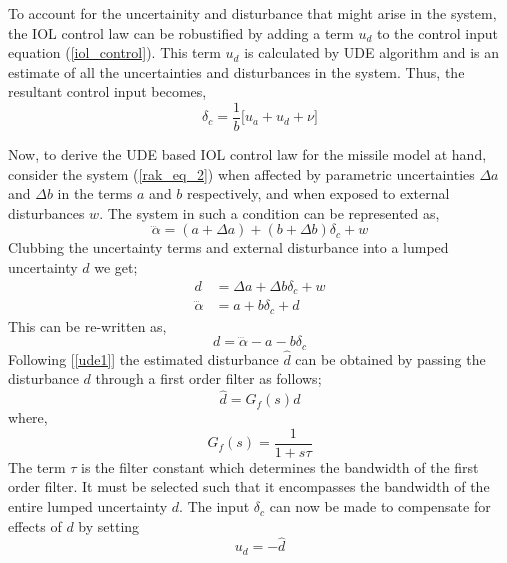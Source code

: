 \documentclass[conference]{IEEEtran}
\begin{document}
		To account for the uncertainity and disturbance that might arise in the system, the IOL control law can be robustified by adding a term $u_d$ to the control input equation (\ref{iol_control}). This term $u_d$ is calculated by UDE algorithm and is an estimate of all the uncertainties and disturbances in the system. Thus, the resultant control input becomes, 
		\begin{equation}
		\label{ude_control_law}
			\delta_c = \frac{1}{b}\Big[u_a+u_d+\nu\Big] 
		\end{equation}
		
		Now, to derive the UDE based IOL control law for the missile model at hand, consider the system (\ref{rak_eq_2}) when affected by parametric uncertainties $\Delta a$ and $\Delta b$ in the terms $a$ and $b$ respectively, and when exposed to external disturbances $w$. The system in such a condition can be represented as,
		\begin{equation}
			\dddot{\alpha}=(a + \Delta a) + (b + \Delta b)\delta_c + w \nonumber
		\end{equation}
		Clubbing the uncertainty terms and external disturbance into a lumped uncertainty $d$ we get;
		\begin{equation}
			\begin{aligned}
				d &= \Delta a + \Delta b \delta_c + w \\
				\dddot{\alpha} &= a + b\delta_c + d \nonumber	
			\end{aligned}
		\end{equation}		
		This can be re-written as,
		\begin{equation}
			d=\dddot{\alpha}-a-b\delta_c \label{ude_eqn1}
		\end{equation}
		Following [\ref{ude1}] the estimated disturbance $\hat{d}$ can be obtained by passing the disturbance $d$ through a first order filter as follows;
		\begin{equation}
			\hat{d}=G_f(s)d \nonumber
		\end{equation}
		where,
		\begin{equation}
		\label{ude_filter}
			G_f(s)=\frac{1}{1+s\tau}
		\end{equation}
		The term $\tau$ is the filter constant which determines the bandwidth of the first order filter. It must be selected such that it encompasses the bandwidth of the entire lumped uncertainty $d$. The input $\delta_c$ can now be made to compensate for effects of $d$ by setting		
		\begin{equation}
		\label{ud_equals_minus_d}
			u_d = -\hat{d}
		\end{equation}
\end{document}
